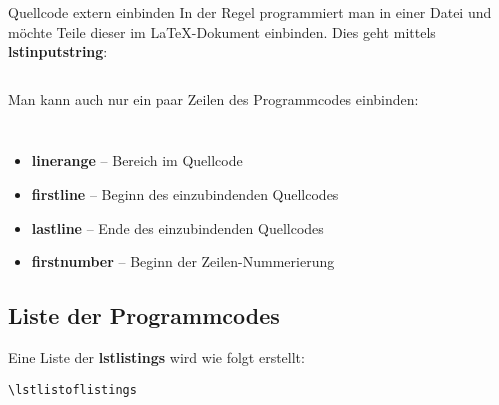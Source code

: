 \begin{frame}[fragile]{Quellcode extern einbinden}
In der Regel programmiert man in einer Datei und möchte Teile dieser im \LaTeX-Dokument einbinden. Dies geht mittels \textbf{lstinputstring}:

\begin{lstlisting}[style=tex, caption=lstlisting]
\end{lstlisting}

Man kann auch nur ein paar Zeilen des Programmcodes einbinden:

\begin{lstlisting}[style=tex, firstnumber=2]
\end{lstlisting}

\begin{lstlisting}[style=tex, firstnumber=3]
\end{lstlisting}

\begin{itemize}
\item \textbf{linerange} -- Bereich im Quellcode
\item \textbf{firstline} -- Beginn des einzubindenden Quellcodes
\item \textbf{lastline} -- Ende des einzubindenden Quellcodes 
\item \textbf{firstnumber} -- Beginn der Zeilen-Nummerierung
\end{itemize}
\end{frame}

\subsection{Liste der Programmcodes}
\begin{frame}[fragile]
Eine Liste der \textbf{lstlistings} wird wie folgt erstellt:

\begin{lstlisting}[style=tex]
\lstlistoflistings\end{lstlisting}
\end{frame}

